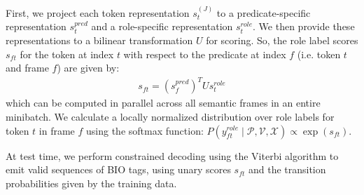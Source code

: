 \documentclass[11pt,a4paper]{article}
\begin{document}
First, we project each token representation $s_t^{(J)}$ to a predicate-specific representation $s_t^{pred}$ and a role-specific representation $s_t^{role}$.
We then provide these representations to a bilinear transformation $U$ for scoring. So, the role label scores $s_{ft}$ for the token at index $t$ with respect to the predicate at index $f$ (i.e. token $t$ and frame $f$) are given by:
\begin{align}
\label{eqn:bilinear}
s_{ft} = (s_f^{pred})^T U s_t^{role}
\end{align}
which can be computed in parallel across all semantic frames in an entire minibatch. We calculate a locally normalized distribution over role labels for token $t$ in frame $f$ using the softmax function: $P(y_{ft}^{role}\mid \mathcal{P},\mathcal{V}, \mathcal{X}) \propto \exp(s_{ft})$.

At test time, we perform constrained decoding using the Viterbi algorithm to emit valid sequences of BIO tags, using unary scores $s_{ft}$ and the transition probabilities given by the training data.

\end{document}
